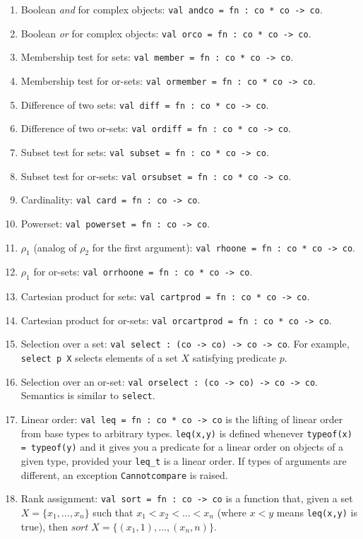 \begin{enumerate}
\item Boolean {\it and} for complex objects: {\tt val andco = fn : co
* co -> co}. 
\item Boolean {\it or} for complex objects: {\tt val orco = fn : co *
co -> co}. 
\item Membership test for sets: {\tt val member = fn : co * co -> co}.
\item Membership test for or-sets: {\tt val ormember = fn : co * co ->
co}. 
\item Difference of two sets: {\tt val diff = fn : co * co -> co}. 
\item Difference of two or-sets: {\tt val ordiff = fn : co * co -> co}. 
\item Subset test for sets: {\tt val subset = fn : co * co -> co}.
\item Subset test for or-sets: {\tt val orsubset = fn : co * co -> co}.
\item Cardinality: {\tt val card = fn : co -> co}.
\item Powerset: {\tt val powerset = fn : co -> co}.
\item $\rho_1$ (analog of $\rho_2$ for the first argument): {\tt val
rhoone = fn : co * co -> co}.
\item $\rho_1$ for or-sets: {\tt val orrhoone = fn : co * co -> co}.
\item Cartesian product for sets: {\tt val cartprod = fn : co * co -> co}.
\item Cartesian product for or-sets: {\tt val orcartprod = fn : co *
co -> co}.
\item Selection over a set: {\tt val select : (co -> co) -> co -> co}.
For example, {\tt select p X} selects elements of a set $X$
satisfying predicate $p$. 
\item Selection over an or-set: {\tt val orselect : (co -> co) -> co ->
co}. Semantics is similar to {\tt select}.
\item Linear order: {\tt val leq = fn : co * co -> co}
is the lifting of linear order from base types to arbitrary types.
{\tt leq(x,y)} is defined whenever {\tt typeof(x) = typeof(y)} and it
gives you a predicate for a linear order on objects of a given type,
provided your {\tt leq\_t} is a linear order. 
If types of arguments are different, an exception {\tt Cannotcompare} is
raised.
\item Rank assignment: {\tt val sort = fn : co -> co}
is a function that, given a set $X = \{x_1,\ldots,x_n\}$ such that 
$x_1 < x_2 < \ldots < x_n$ (where $x < y$ means {\tt leq(x,y)} is true), then 
$sort\; X = \{(x_1,1),\ldots,(x_n,n)\}$. 
\end{enumerate}


